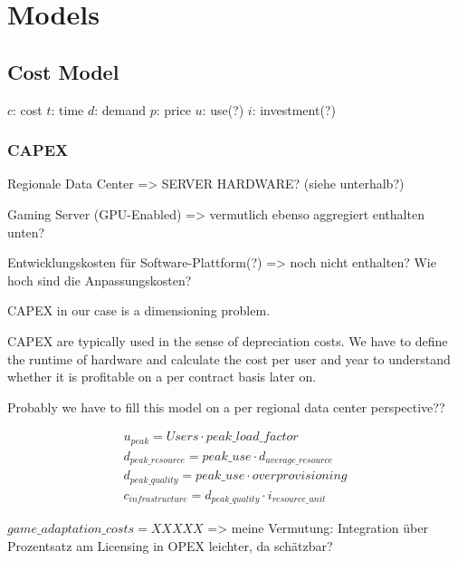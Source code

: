 \section{Models}


\subsection{Cost Model}



$c$: cost
$t$: time
$d$: demand
$p$: price
$u$: use(?)
$i$: investment(?)

\subsubsection{CAPEX}

Regionale Data Center => SERVER HARDWARE? (siehe unterhalb?)

Gaming Server (GPU-Enabled) => vermutlich ebenso aggregiert enthalten unten?

Entwicklungskosten für Software-Plattform(?) => noch nicht enthalten? Wie hoch sind die Anpassungskosten?

CAPEX in our case is a dimensioning problem.

CAPEX are typically used in the sense of depreciation costs. We have to define the runtime of hardware and calculate the cost per user and year to understand whether it is profitable on a per contract basis later on.

Probably we have to fill this model on a per regional data center perspective??

\begin{align*}
u_{peak} = Users \cdot peak\_load\_factor \\
d_{peak\_resource} = peak\_use \cdot d_{average\_resource} \\
d_{peak\_quality} = peak\_use \cdot overprovisioning \\
c_{infrastructure} = d_{peak\_quality} \cdot i_{resource\_unit}
\end{align*}

$game\_adaptation\_costs = XXXXX$ => meine Vermutung: Integration über Prozentsatz am Licensing in OPEX leichter, da schätzbar?

